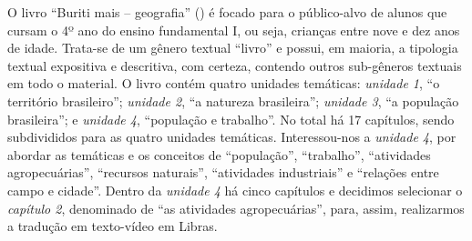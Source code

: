 \documentclass[portuguese]{textolivre}
\begin{document}
O livro “Buriti mais – geografia” () é focado para o público-alvo de alunos que cursam o 4º ano do ensino fundamental I, ou seja, crianças entre nove e dez anos de idade. Trata-se de um gênero textual “livro” e possui, em maioria, a tipologia textual expositiva e descritiva, com certeza, contendo outros sub-gêneros textuais em todo o material. O livro contém quatro unidades temáticas: \textit{unidade 1}, “o território brasileiro”; \textit{unidade 2}, “a natureza brasileira”; \textit{unidade 3}, “a população brasileira”; e \textit{unidade 4}, “população e trabalho”. No total há 17 capítulos, sendo subdivididos para as quatro unidades temáticas. Interessou-nos a \textit{unidade 4}, por abordar as temáticas e os conceitos de “população”, “trabalho”, “atividades agropecuárias”, “recursos naturais”, “atividades industriais” e “relações entre campo e cidade”. Dentro da \textit{unidade 4} há cinco capítulos e decidimos selecionar o \textit{capítulo 2}, denominado de “as atividades agropecuárias”, para, assim, realizarmos a tradução em texto-vídeo em Libras.
\end{document}
